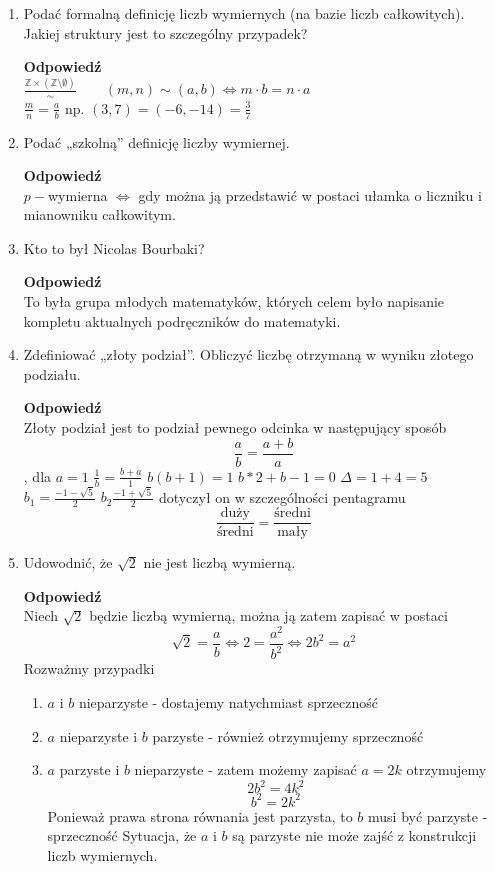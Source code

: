 \documentclass[12pt,a4paper]{article}
\theoremstyle{break}
\newcommand{\Odp}[1]{
		\begin{mdframed}[style=zadanie]
			\textbf{Odpowiedź}\\
			#1
		\end{mdframed}
	}
\begin{document}
\begin{enumerate}[1.]
	\item Podać formalną definicję liczb wymiernych (na bazie liczb całkowitych). Jakiej struktury jest to szczególny przypadek?
	\Odp{
	$\frac{\mathbb{Z}\times (\mathbb{Z}\setminus\emptyset)}{\sim} \qquad (m,n)\sim (a,b) \Leftrightarrow m\cdot b=n\cdot a$\\
	$\frac{m}{n}=\frac{a}{b}$ np. $(3,7)=(-6,-14)=\frac{3}{7}$
	}
	
	\item Podać „szkolną” definicję liczby wymiernej.
	\Odp{
		$p-$wymierna $\Leftrightarrow$ gdy można ją przedstawić w postaci ułamka o liczniku i mianowniku całkowitym.
	}
	\newpage
	\item Kto to był Nicolas Bourbaki?
	\Odp{
		To była grupa młodych matematyków, których celem było napisanie kompletu aktualnych podręczników do matematyki.
	}
	
	\item Zdefiniować „złoty podział”. Obliczyć liczbę otrzymaną w wyniku złotego podziału.
	\Odp{Złoty podział jest to podział pewnego odcinka w następujący sposób
	$$\frac{a}{b}=\frac{a+b}{a}$$, dla $a=1$
	$\frac{1}{b}=\frac{b+a}{1}$
	$b(b+1)=1$
	$b*2+b-1=0$
	$\Delta=1+4=5$
	$b_1=\frac{-1-\sqrt{5}}{2}$
	$b_2\frac{-1+\sqrt{5}}{2}$
	dotyczył on w szczególności pentagramu
	$$\frac{\text{duży}}{\text{średni}}=\frac{\text{średni}}{\text{mały}}$$
	}
	
	\item Udowodnić, że $\sqrt{2}$ nie jest liczbą wymierną.
	\Odp{
		Niech $\sqrt{2}$ będzie liczbą wymierną, można ją zatem zapisać w postaci 
		$$\sqrt{2}=\frac{a}{b} \Leftrightarrow 2=\frac{a^2}{b^2} \Leftrightarrow 2b^2=a^2$$
		Rozważmy przypadki 
		\begin{enumerate}[1$^\circ$]
			\item $a$ i $b$ nieparzyste - dostajemy natychmiast sprzeczność
			\item $a$ nieparzyste i $b$ parzyste - również otrzymujemy sprzeczność
			\item $a$ parzyste i $b$ nieparzyste - zatem możemy zapisać $a=2k$ otrzymujemy
			$$2b^2=4k^2$$
			$$b^2=2k^2$$
			Ponieważ prawa strona równania jest parzysta, to $b$ musi być parzyste - sprzeczność
			Sytuacja, że $a$ i $b$ są parzyste nie może zajść z konstrukcji liczb wymiernych.
			

\end{enumerate}}
\end{enumerate}
\end{document}
